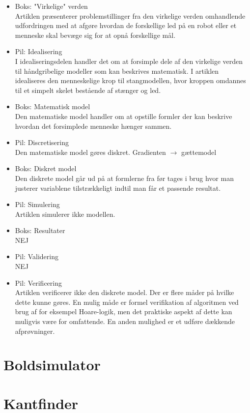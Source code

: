 \documentclass{article}
\begin{document}
\begin{itemize}
	\item Boks: "Virkelige" verden \\
	Artiklen præsenterer problemstillinger fra den virkelige verden omhandlende udfordringen med at afgøre hvordan de forskellige led på en robot eller et menneske skal bevæge sig for at opnå forskellige mål.
	\item Pil: Idealisering \\
	I idealiseringsdelen handler det om at forsimple dele af den virkelige verden til håndgribelige modeller som kan beskrives matematisk. I artiklen idealiseres den menneskelige krop til stangmodellen, hvor kroppen omdannes til et simpelt skelet bestående af stænger og led.
	\item Boks: Matematisk model \\
	Den matematiske model handler om at opstille formler der kan beskrive hvordan det forsimplede menneske hænger sammen.
	\item Pil: Discretisering \\
	Den matematiske model gøres diskret. Gradienten $\rightarrow$ gættemodel%
	\item Boks: Diskret model \\
	Den diskrete model går ud på at formlerne fra før tages i brug hvor man justerer variablene tilstrækkeligt indtil man får et passende resultat. %
	\item Pil: Simulering \\
	Artiklen simulerer ikke modellen. %
	\item Boks: Resultater \\
	NEJ %
	\item Pil: Validering \\
	NEJ %
	\item Pil: Verificering \\
	Artiklen verificerer ikke den diskrete model. Der er flere måder på hvilke dette kunne gøres. En mulig måde er formel verifikation af algoritmen ved brug af for eksempel Hoare-logik, men det praktiske aspekt af dette kan muligvis være for omfattende. En anden mulighed er et udføre dækkende afprøvninger.
\end{itemize}

\section{Boldsimulator}

\section{Kantfinder}
\end{document}
